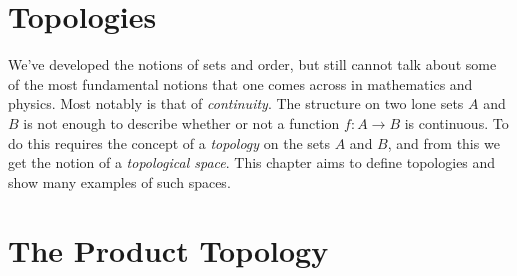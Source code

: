 \begingroup
    \ifcsname\PATH\endcsname
        \newcommand{\PATH}{books/Topology/Topological_Spaces}
        \newcommand{\OLDPATH}{\PATH}
    \else
        \newcommand{\OLDPATH}{\PATH}
        \renewcommand{\PATH}{books/Topology/Topological_Spaces}
    \fi
    \chapter{Topologies}
        We've developed the notions of sets and order, but still cannot talk
        about some of the most fundamental notions that one comes across in
        mathematics and physics. Most notably is that of \textit{continuity}.
        The structure on two lone sets $A$ and $B$ is not enough to describe
        whether or not a function $f:A\rightarrow{B}$ is continuous. To do this
        requires the concept of a \textit{topology} on the sets $A$ and $B$, and
        from this we get the notion of a \textit{topological space}. This
        chapter aims to define topologies and show many examples of such spaces.
        
    \chapter{The Product Topology}
        
    \renewcommand{\PATH}{\OLDPATH}
\endgroup